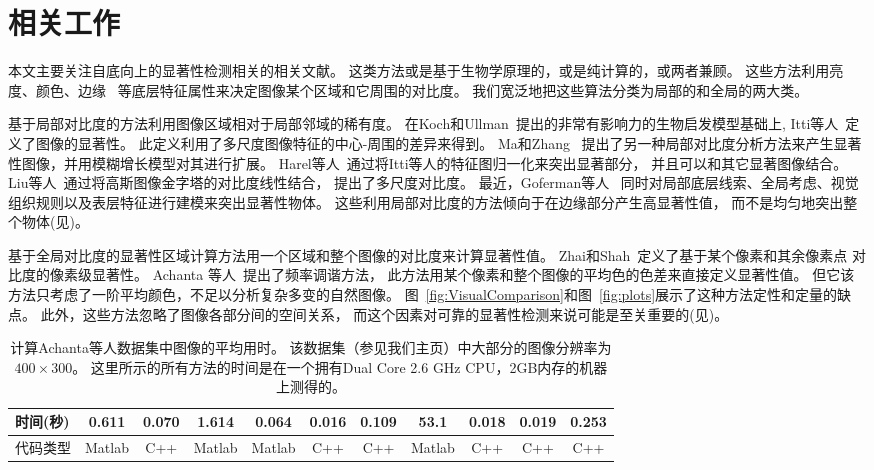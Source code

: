 \documentclass[12pt,singlecolumn,letterpaper]{article}
\begin{document}
\section{相关工作}
\label{sec:RelatedWorks}

本文主要关注自底向上的显著性检测相关的相关文献。
这类方法或是基于生物学原理的，或是纯计算的，或两者兼顾。
这些方法利用亮度、颜色、边缘~\cite{09cvpr/Achanta_FTSaliency}
等底层特征属性来决定图像某个区域和它周围的对比度。
我们宽泛地把这些算法分类为局部的和全局的两大类。

基于局部对比度的方法利用图像区域相对于局部邻域的稀有度。
在Koch和Ullman~\cite{85HN/KochVisualAttention}提出的非常有影响力的生物启发模型基础上,
Itti等人~\cite{98pami/Itti}定义了图像的显著性。
此定义利用了多尺度图像特征的中心-周围的差异来得到。
Ma和Zhang~\cite{03ACMMM/Ma_Contrast-based}
提出了另一种局部对比度分析方法来产生显著性图像，并用模糊增长模型对其进行扩展。
Harel等人~\cite{conf/nips/HarelKP06}通过将Itti等人的特征图归一化来突出显著部分，
并且可以和其它显著图像结合。
Liu等人~\cite{10pami/Liu_Learning}通过将高斯图像金字塔的对比度线性结合，
提出了多尺度对比度。
最近，Goferman等人~\cite{10cvpr/goferman_context}
同时对局部底层线索、全局考虑、视觉组织规则以及表层特征进行建模来突出显著性物体。
这些利用局部对比度的方法倾向于在边缘部分产生高显著性值，
而不是均匀地突出整个物体(见)。

基于全局对比度的显著性区域计算方法用一个区域和整个图像的对比度来计算显著性值。
Zhai和Shah~\cite{06acmmm/ZhaiS_spatiotemporal}定义了基于某个像素和其余像素点
对比度的像素级显著性。
Achanta 等人~\cite{09cvpr/Achanta_FTSaliency}提出了频率调谐方法，
此方法用某个像素和整个图像的平均色的色差来直接定义显著性值。
但它该方法只考虑了一阶平均颜色，不足以分析复杂多变的自然图像。
图~\ref{fig:VisualComparison}和图~\ref{fig:plots}展示了这种方法定性和定量的缺点。
此外，这些方法忽略了图像各部分间的空间关系，
而这个因素对可靠的显著性检测来说可能是至关重要的(见)。


\begin{table*}
    \centering
    \begin{tabular}{l|c|c|c|c|c|c|c|c|c|c} \hline\hline
      时间(秒) & 0.611  & 0.070 & 1.614  & 0.064  & 0.016 & 0.109 &  53.1  & 0.018 & 0.019 & 0.253 \\ \hline
      代码类型    & Matlab & C++   & Matlab & Matlab &  C++  &  C++  & Matlab &  C++  &  C++  &  C++  \\ \hline\hline
    \end{tabular}
    \caption{计算Achanta等人数据集\cite{09cvpr/Achanta_FTSaliency}中图像的平均用时。
        该数据集（参见我们主页）中大部分的图像分辨率为$400\times300$。
        这里所示的所有方法的时间是在一个拥有Dual Core 2.6 GHz
        CPU，2GB内存的机器上测得的。
    } \label{tab:TimeEfficency}
\end{table*}
\end{document}
